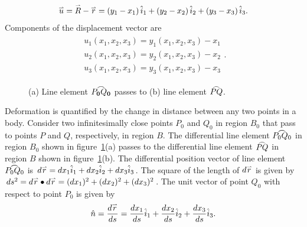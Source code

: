 \documentclass{AeroStructure-ERJohnson}
\def\harp#1{\smash{\mathord{\buildrel{\lower3pt\hbox{$\scriptscriptstyle\rightharpoonup$}}\over{#1}}}}
\def\tfrown#1{\overset{\smash{\lower3pt\hbox{$\frown$}}}{#1}}
\begin{document}
\begin{align}\label{eqA.5}
\harp{u}=\harp{R}-\harp{r}=\left(y_{1}-x_{1}\right) \hat{i}_{1}+\left(y_{2}-x_{2}\right) \hat{i}_{2}+\left(y_{3}-x_{3}\right) \hat{i}_{3}.
\end{align}
Components of the displacement vector are
\begin{align}\label{eqA.6}
\begin{split}
u_{1}(x_{1}, x_{2}, x_{3})=y_{1}(x_{1}, x_{2}, x_{3})-x_{1} \\
u_{2}(x_{1}, x_{2}, x_{3})=y_{2}(x_{1}, x_{2}, x_{3})-x_{2} \\
u_{3}(x_{1}, x_{2}, x_{3})=y_{3}(x_{1}, x_{2}, x_{3})-x_{3}
\end{split}.
\end{align}
\begin{figure}
\caption{(a) Line element $\protect\tfrown{P_{\textbf{0}}Q_{\textbf{0}}}$ passes to (b) line element $\protect\tfrown{PQ}$.\label{figA.2}}
\end{figure}
\indent Deformation is quantified by the change in distance between any two points in a body. Consider two infinitesimally close points $P_{0}$ and $Q_{0}$ in region $B_{0}$ that pass to points $P$ and $Q$, respectively, in region $B$. The differential line element $\tfrown{P_{0} Q_{0}}$ in region $B_{0}$ shown in figure~\ref{figA.2}(a) passes to the differential line element $\tfrown{PQ}$ in region $B$ shown in figure~\ref{figA.2}(b). The differential position vector of line element $\tfrown{P_{0} Q_{0}}$ is $d \harp{r}=d x_{1} \hat{i}_{1}+d x_{2} \hat{i}_{2}+d x_{3} \hat{i}_{3}$. The square of the length of $d \harp{r}$ is given by $d s^{2}=d \harp{r} \bullet d \harp{r}=(d x_{1})^{2}+(d x_{2})^{2}+(d x_{3})^{2}$. The unit vector of point $Q_{0}$ with respect to point $P_{0}$ is given by
\begin{align}\label{eqA.7}
\hat{n}=\frac{d \harp{r}}{d s}=\frac{d x_{1}}{d s} \hat{i}_{1}+\frac{d x_{2}}{d s} \hat{i}_{2}+\frac{d x_{3}}{d s} \hat{i}_{3}.
\end{align}
\end{document}
